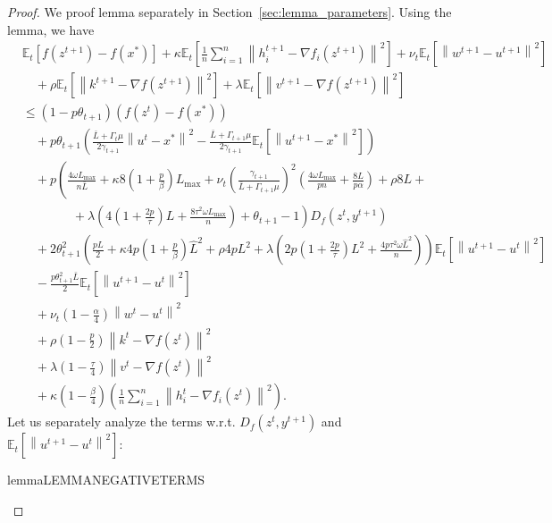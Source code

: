 \documentclass{article} %
\newcommand{\norm}[1]{\left\| #1 \right\|}
\newcommand{\ExpSub}[2]{{\mathbb{E}}_{#1}\left[#2\right]}
\theoremstyle{plain}
\theoremstyle{definition}
\theoremstyle{remark}
\begin{document}
\begin{proof}
  We proof lemma separately in Section~\ref{sec:lemma_parameters}. Using the lemma, we have
  \begin{align*}
    &\ExpSub{t}{f(z^{t+1}) - f(x^*)} + \kappa \ExpSub{t}{\frac{1}{n}\sum_{i=1}^n \norm{h_i^{t+1} - \nabla f_i(z^{t+1})}^2} + \nu_{t} \ExpSub{t}{\norm{w^{t+1} - u^{t+1}}^2}\\
    &\quad  + \rho \ExpSub{t}{\norm{k^{t+1} - \nabla f(z^{t+1})}^2} + \lambda \ExpSub{t}{\norm{v^{t+1} - \nabla f(z^{t+1})}^2}\\
    &\leq (1 - p\theta_{t+1}) \left(f(z^{t}) - f(x^*)\right) \\
    &\quad+ p\theta_{t+1} \left(\frac{\bar{L} + \Gamma_{t} \mu}{2 \gamma_{t+1}} \norm{u^t - x^*}^2 - \frac{\bar{L} + \Gamma_{t+1} \mu}{2 \gamma_{t+1}} \ExpSub{t}{\norm{u^{t+1} - x^*}^2}\right) \\
    &\quad+ p\left(\frac{4 \omega L_{\max}}{n \bar{L}} + \kappa 8 \left(1 + \frac{p}{\beta}\right) L_{\max} + \nu_{t} \left(\frac{\gamma_{t+1}}{\bar{L} + \Gamma_{t+1} \mu}\right)^2\left(\frac{4 \omega L_{\max}}{p n} + \frac{8L}{p \alpha}\right) + \rho 8 L +  \right. \\
    &\qquad\qquad+ \left. \lambda \left(4 \left(1 + \frac{2 p}{\tau}\right) L + \frac{8 \tau^2 \omega L_{\max}}{n}\right) + \theta_{t+1} - 1\right) D_f(z^t, y^{t+1}) \\
    &\quad+ 2 \theta_{t+1}^2 \left(\frac{pL}{2} + \kappa 4 p \left(1 + \frac{p}{\beta}\right) \widehat{L}^2 + \rho 4 p L^2 + \lambda \left(2 p \left(1 + \frac{2 p}{\tau}\right) L^2 + \frac{4 p \tau^2 \omega \widehat{L}^2}{n}\right) \right) \ExpSub{t}{\norm{u^{t+1} - u^t}^2} \\
    &\quad - \frac{p \theta_{t+1}^2 \bar{L}}{2} \ExpSub{t}{\norm{u^{t+1} - u^t}^2} \\
    &\quad + \nu_{t} \left(1 - \frac{\alpha}{4}\right) \norm{w^t - u^t}^2 \\
    &\quad + \rho \left(1 - \frac{p}{2}\right) \norm{k^{t} - \nabla f(z^t)}^2 \\
    &\quad + \lambda \left(1 - \frac{\tau}{4}\right) \norm{v^{t} - \nabla f(z^t)}^2 \\
    &\quad + \kappa \left(1 - \frac{\beta}{4}\right) \left(\frac{1}{n}\sum_{i=1}^n \norm{h_i^t - \nabla f_i(z^{t})}^2\right).
  \end{align*}
  Let us separately analyze the terms w.r.t. $D_f(z^t, y^{t+1})$ and $\ExpSub{t}{\norm{u^{t+1} - u^t}^2}$:
  \begin{restatable}{lemma}{LEMMANEGATIVETERMS}

\end{restatable}
\end{proof}
\end{document}
